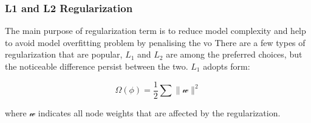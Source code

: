 \subsubsection{L1 and L2 Regularization}

The main purpose of regularization term is to reduce model complexity and help to avoid model overfitting problem by penalising the vo There are a few types of regularization that are popular, $L_1$ and $L_2$ are among the preferred choices, but the noticeable difference persist between the two. $L_1$ adopts form:

\begin{equation}
   \Omega(\phi) = \frac {1}{2} \sum \parallel \mathcal{w} \parallel^2
\end{equation}

where $\mathcal{w}$ indicates all node weights that are affected by the regularization. 